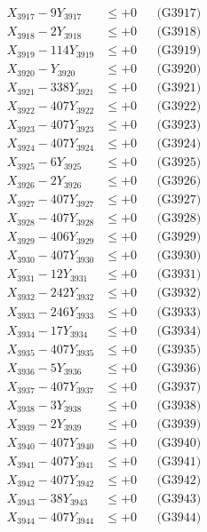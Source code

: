 \documentclass[a4paper,10pt]{article}
\begin{document}
{\begin{align}
X_{3917} - 9Y_{3917} &\leq +0 && \text{(G3917)} \\
X_{3918} - 2Y_{3918} &\leq +0 && \text{(G3918)} \\
X_{3919} - 114Y_{3919} &\leq +0 && \text{(G3919)} \\
X_{3920} - Y_{3920} &\leq +0 && \text{(G3920)} \\
\allowbreak
X_{3921} - 338Y_{3921} &\leq +0 && \text{(G3921)} \\
X_{3922} - 407Y_{3922} &\leq +0 && \text{(G3922)} \\
X_{3923} - 407Y_{3923} &\leq +0 && \text{(G3923)} \\
X_{3924} - 407Y_{3924} &\leq +0 && \text{(G3924)} \\
X_{3925} - 6Y_{3925} &\leq +0 && \text{(G3925)} \\
X_{3926} - 2Y_{3926} &\leq +0 && \text{(G3926)} \\
X_{3927} - 407Y_{3927} &\leq +0 && \text{(G3927)} \\
X_{3928} - 407Y_{3928} &\leq +0 && \text{(G3928)} \\
X_{3929} - 406Y_{3929} &\leq +0 && \text{(G3929)} \\
X_{3930} - 407Y_{3930} &\leq +0 && \text{(G3930)} \\
\allowbreak
X_{3931} - 12Y_{3931} &\leq +0 && \text{(G3931)} \\
X_{3932} - 242Y_{3932} &\leq +0 && \text{(G3932)} \\
X_{3933} - 246Y_{3933} &\leq +0 && \text{(G3933)} \\
X_{3934} - 17Y_{3934} &\leq +0 && \text{(G3934)} \\
X_{3935} - 407Y_{3935} &\leq +0 && \text{(G3935)} \\
X_{3936} - 5Y_{3936} &\leq +0 && \text{(G3936)} \\
X_{3937} - 407Y_{3937} &\leq +0 && \text{(G3937)} \\
X_{3938} - 3Y_{3938} &\leq +0 && \text{(G3938)} \\
X_{3939} - 2Y_{3939} &\leq +0 && \text{(G3939)} \\
X_{3940} - 407Y_{3940} &\leq +0 && \text{(G3940)} \\
\allowbreak
X_{3941} - 407Y_{3941} &\leq +0 && \text{(G3941)} \\
X_{3942} - 407Y_{3942} &\leq +0 && \text{(G3942)} \\
X_{3943} - 38Y_{3943} &\leq +0 && \text{(G3943)} \\
X_{3944} - 407Y_{3944} &\leq +0 && \text{(G3944)} \\

\end{align}}
\end{document}
